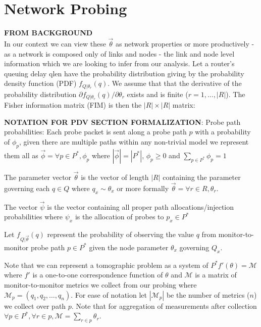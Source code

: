 \section{Network Probing}
\label{sec:Mnetworkprobing}
    \begin{mdframed}\textbf{FROM BACKGROUND}\\
    In our context we can view these $\vec{\theta}$ as network properties or more productively - as a network is composed only of links and nodes - the link  and node level information which we are looking to infer from our analysis.
    Let a router's queuing delay \gls{qlen} have the probability distribution giving by the probability density function (PDF) $f_{Q|\theta_r}(q)$. We assume that that the derivative of the probability distribution $\partial f_{Q|\theta_r}(q)/\partial \theta_r$ exists and is finite (\ie $r = 1, ..., |R|$). The Fisher information matrix (FIM) is then the $|R|\times |R|$ matrix:

    \textbf{NOTATION FOR PDV SECTION FORMALIZATION}:
    Probe path probabilities: Each probe packet is sent along a probe path $p$ with a probability of $\phi_p$, given there are multiple paths within any non-trivial model we represent them all as $\vec{\phi}=\forall p\in P^*, \phi_p$ where $|\vec{\phi}|=|P^*|$, $\phi_p \geq 0$ and $\sum_{p\in P^*}\phi_p = 1$
    
    The parameter vector $\vec{\theta}$ is the vector of length $|R|$ containing the parameter governing each $q\in Q$ where $ q_x \sim \theta_x$ or more formally $\vec{\theta}=\forall r\in R, \theta_r$.
    
    The vector $\vec{\psi}$ is the vector containing all proper path allocations/injection probabilities where $\psi_x$ is the allocation of probes to $p_x\in P^*$ 
    
    Let $f_{Q|\vec{\theta}}(q)$ represent the probability of observing the value $q$ from monitor-to-monitor probe path $p\in P^*$ given the node parameter $\theta_x$ governing $Q_x$.
    
    Note that we can represent a tomographic problem as a system of $P^*f'(\theta)=\mathcal{M}$ where $f'$ is a one-to-one correspondence function of $\theta$ and $\mathcal{M}$ is a matrix of monitor-to-monitor metrics we collect from our probing where $\mathcal{M}_p = (q_1,q_2,\ldots, q_n)$. For ease of notation let $|\mathcal{M}_p|$ be the number of metrics ($n$) we collect over path $p$. Note that for aggregation of measurements after collection $\forall p\in P^*, \forall r\in p, \mathcal{M}=\sum_{r\in p}\theta_r$.
\end{mdframed}

